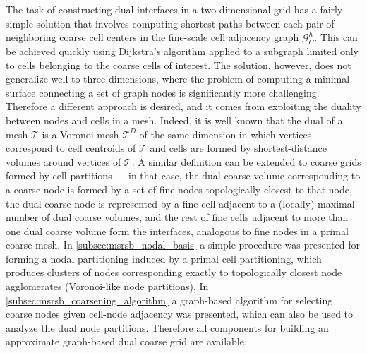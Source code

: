 The task of constructing dual interfaces in a two-dimensional grid has a fairly simple solution that involves computing shortest paths between each pair of neighboring coarse cell centers in the fine-scale cell adjacency graph $\mathcal{G}_C^h$.   This can be achieved quickly using Dijkstra's algorithm applied to a subgraph limited only to cells belonging to the coarse cells of interest.   The solution, however, does not generalize well to three dimensions, where the problem of computing a minimal surface connecting a set of graph nodes is significantly more challenging.   Therefore a different approach is desired, and it comes from exploiting the duality between nodes and cells in a mesh.   Indeed, it is well known that the dual of a mesh $\mathcal{T}$ is a Voronoi mesh $\mathcal{T}^D$ of the same dimension in which vertices correspond to cell centroids of $\mathcal{T}$ and cells are formed by shortest-distance volumes around vertices of $\mathcal{T}$.   A similar definition can be extended to coarse grids formed by cell partitions --- in that case, the dual coarse volume corresponding to a coarse node is formed by a set of fine nodes topologically closest to that node, the dual coarse node is represented by a fine cell adjacent to a (locally) maximal number of dual coarse volumes, and the rest of fine cells adjacent to more than one dual coarse volume form the interfaces, analogous to fine nodes in a primal coarse mesh.   In \cref{subsec:msrsb_nodal_basis} a simple procedure was presented for forming a nodal partitioning induced by a primal cell partitioning, which produces clusters of nodes corresponding exactly to topologically closest node agglomerates (Voronoi-like node partitions).   In \cref{subsec:msrsb_coarsening_algorithm} a graph-based algorithm for selecting coarse nodes given cell-node adjacency was presented, which can also be used to analyze the dual node partitions.   Therefore all components for building an approximate graph-based dual coarse grid are available.   

